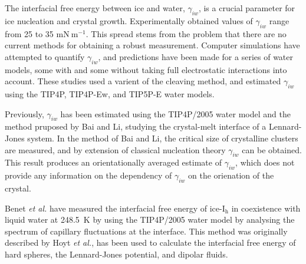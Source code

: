 
The interfacial free energy between ice and water, $\gamma_{iw}$, is a
crucial parameter for ice nucleation and crystal
growth.\cite{Pruppacher1967,Pruppacher1995} Experimentally obtained
values of $\gamma_{iw}$ range from 25 to 35
$\mathrm{mN}~\mathrm{m}^{-1}$.\cite{Pruppacher1995} This spread stems
from the problem that there are no current methods for obtaining a
robust measurement. Computer simulations have attempted to quantify
$\gamma_{iw}$, and predictions have been made for a series of water
models, some with\cite{Davidchack2012} and some
without\cite{Handel2008} taking full electrostatic interactions into
account. These studies used a varient of the cleaving
method,\cite{Broughton1986} and estimated $\gamma_{iw}$ using the
TIP4P, TIP4P-Ew, and TIP5P-E water models.

Previously, $\gamma_{iw}$ has been estimated using the TIP4P/2005
water model and the method pruposed by Bai and Li, studying the
crystal-melt interface of a Lennard-Jones system.\cite{Bai2006} In the
method of Bai and Li, the critical size of crystalline clusters are
measured, and by extension of classical nucleation theory
$\gamma_{iw}$ can be obtained.\cite{Volmer1926,Becker1935} This result
produces an orientationally averaged estimate of $\gamma_{iw}$, which
does not provide any information on the dependency of $\gamma_{iw}$ on
the orienation of the crystal.

Benet \textit{et al.} have measured the interfacial free energy of
ice-I$_\mathrm{h}$ in coexistence with liquid water at 248.5~K by
using the TIP4P/2005 water model by analysing the spectrum of
capillary fluctuations at the interface.\cite{Benet2014} This method
was originally described by Hoyt \textit{et al.}\cite{Hoyt2001}, has
been used to calculate the interfacial free energy of hard
spheres,\cite{Davidchack2006} the Lennard-Jones
potential,\cite{Morris2003} and dipolar fluids.\cite{Wang2013}


